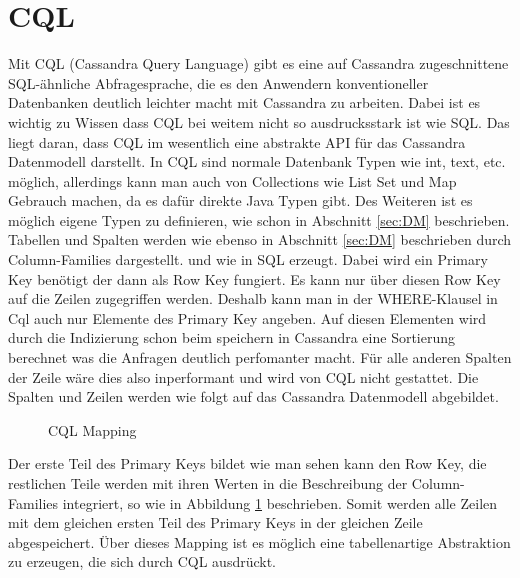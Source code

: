 \section{CQL}
Mit CQL (Cassandra Query Language) gibt es eine auf Cassandra zugeschnittene SQL-ähnliche Abfragesprache, die es den Anwendern konventioneller Datenbanken deutlich leichter macht mit Cassandra zu arbeiten. Dabei ist es wichtig zu Wissen dass CQL bei weitem nicht so ausdrucksstark ist wie SQL. Das liegt daran, dass CQL im wesentlich eine abstrakte API für das Cassandra Datenmodell darstellt. In CQL sind normale Datenbank Typen wie int, text, etc. möglich, allerdings kann man auch von Collections wie List Set und Map Gebrauch machen, da es dafür direkte Java Typen gibt. Des Weiteren ist es möglich eigene Typen zu definieren, wie schon in Abschnitt \ref{sec:DM} beschrieben.\\
Tabellen und Spalten werden wie ebenso in Abschnitt \ref{sec:DM} beschrieben durch Column-Families dargestellt. und wie in SQL erzeugt. Dabei wird ein Primary Key benötigt der dann als Row Key fungiert. Es kann nur über diesen Row Key auf die Zeilen zugegriffen werden. Deshalb kann man in der WHERE-Klausel in Cql auch nur Elemente des Primary Key angeben. Auf diesen Elementen wird durch die Indizierung schon beim speichern in Cassandra eine Sortierung berechnet was die Anfragen deutlich perfomanter macht. Für alle anderen Spalten der Zeile wäre dies also inperformant und wird von CQL nicht gestattet. Die Spalten und Zeilen werden wie folgt auf das Cassandra Datenmodell abgebildet.\\
\begin{figure}
	\centering
	\caption{CQL Mapping}
	\label{fig:mapping}
\end{figure}
Der erste Teil des Primary Keys bildet wie man sehen kann den Row Key, die restlichen Teile werden mit ihren Werten in die Beschreibung der Column-Families integriert, so wie in Abbildung \ref{fig:mapping} beschrieben. Somit werden alle Zeilen mit dem gleichen ersten Teil des Primary Keys in der gleichen Zeile abgespeichert. Über dieses Mapping ist es möglich eine tabellenartige Abstraktion zu erzeugen, die sich durch CQL ausdrückt.